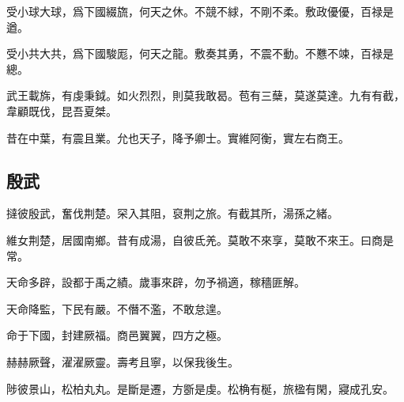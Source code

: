 受小球大球，爲下國綴旒，何天之休。不競不絿，不剛不柔。敷政優優，百禄是遒。

受小共大共，爲下國駿厖，何天之龍。敷奏其勇，不震不動。不戁不竦，百禄是總。

武王載旆，有虔秉鉞。如火烈烈，則莫我敢曷。苞有三蘖，莫遂莫達。九有有截，韋顧既伐，昆吾夏桀。

昔在中葉，有震且業。允也天子，降予卿士。實維阿衡，實左右商王。

\subsection[殷武]{殷武}

撻彼殷武，奮伐荆楚。罙入其阻，裒荆之旅。有截其所，湯孫之緒。

維女荆楚，居國南鄉。昔有成湯，自彼氐羌。莫敢不來享，莫敢不來王。曰商是常。

天命多辟，設都于禹之績。歲事來辟，勿予禍適，稼穡匪解。

天命降監，下民有嚴。不僭不濫，不敢怠遑。

命于下國，封建厥福。商邑翼翼，四方之極。

赫赫厥聲，濯濯厥靈。壽考且寧，以保我後生。

陟彼景山，松柏丸丸。是斷是遷，方斵是虔。松桷有梴，旅楹有閑，寢成孔安。
